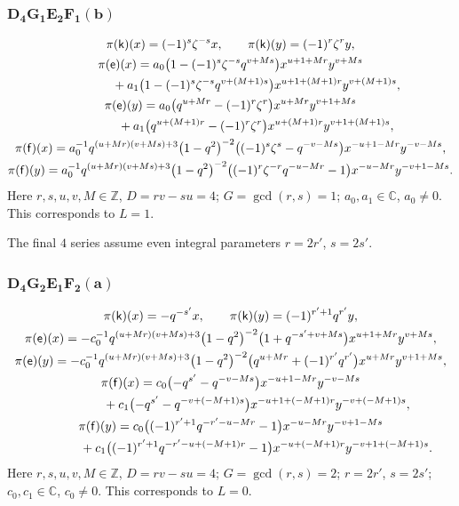 \documentclass[10pt,a4paper]{amsart}
\numberwithin{equation}{section}
\begin{document}
\subsubsection*{$\boldsymbol{D_4G_1E_2F_1(b)}$}
\begin{gather*}
\pi(\mathsf{k})(x)= (-1)^s\zeta^{-s}x ,\qquad\pi(\mathsf{k})(y)=(-1)^r\zeta^ry ,\\
\pi(\mathsf{e})(x)= a_0\big(1-(-1)^s\zeta^{-s}q^{v+Ms}\big)x^{u+1+Mr}y^{v+Ms}\\
\hphantom{\pi(\mathsf{e})(x)=}{} + a_1\big(1-(-1)^s\zeta^{-s}q^{v+(M+1)s}\big)x^{u+1+(M+1)r}y^{v+(M+1)s} ,\\
\pi(\mathsf{e})(y)= a_0\big(q^{u+Mr}-(-1)^r\zeta^r\big)x^{u+Mr}y^{v+1+Ms}\\
\hphantom{\pi(\mathsf{e})(y)=}{} + a_1\big(q^{u+(M+1)r}-(-1)^r\zeta^r\big)x^{u+(M+1)r}y^{v+1+(M+1)s} ,\\
\pi(\mathsf{f})(x)= a_0^{-1}q^{(u+Mr)(v+Ms)+3}\big(1-q^2\big)^{-2}\big((-1)^s\zeta^s-q^{-v-Ms}\big)x^{-u+1-Mr}y^{-v-Ms} ,\\
\pi(\mathsf{f})(y)= a_0^{-1}q^{(u+Mr)(v+Ms)+3}\big(1-q^2\big)^{-2}\big((-1)^r\zeta^{-r}q^{-u-Mr}-1\big)x^{-u-Mr}y^{-v+1-Ms} .
\end{gather*}
Here $r,s,u,v,M\in\mathbb{Z}$, $D=rv-su=4$; $G=\operatorname{gcd}(r,s)=1$; $a_0,a_1\in\mathbb{C}$, $a_0\ne 0$. This corresponds to $L=1$.

The final $4$ series assume even integral parameters $r=2r'$, $s=2s'$.

\subsubsection*{$\boldsymbol{D_4G_2E_1F_2(a)}$}
\begin{gather*}
\pi(\mathsf{k})(x)= -q^{-s'}x ,\qquad\pi(\mathsf{k})(y)=(-1)^{r'+1}q^{r'}y ,\\
\pi(\mathsf{e})(x)= -c_0^{-1}q^{(u+Mr)(v+Ms)+3}\big(1-q^2\big)^{-2}\big(1+q^{-s'+v+Ms}\big)x^{u+1+Mr}y^{v+Ms} ,\\
\pi(\mathsf{e})(y)= -c_0^{-1}q^{(u+Mr)(v+Ms)+3}\big(1-q^2\big)^{-2}\big(q^{u+Mr}+(-1)^{r'}q^{r'}\big)x^{u+Mr}y^{v+1+Ms} ,\\
\pi(\mathsf{f})(x)= c_0\big({-}q^{s'}-q^{-v-Ms}\big)x^{-u+1-Mr}y^{-v-Ms}\\
\hphantom{\pi(\mathsf{f})(x)=}{} + c_1\big({-}q^{s'}-q^{-v+(-M+1)s}\big)x^{-u+1+(-M+1)r}y^{-v+(-M+1)s} ,\\
\pi(\mathsf{f})(y)= c_0\big((-1)^{r'+1}q^{-r'-u-Mr}-1\big)x^{-u-Mr}y^{-v+1-Ms}\\
\hphantom{\pi(\mathsf{f})(y)=}{} + c_1\big((-1)^{r'+1}q^{-r'-u+(-M+1)r}-1\big)x^{-u+(-M+1)r}y^{-v+1+(-M+1)s} .
\end{gather*}
Here $r,s,u,v,M\in\mathbb{Z}$, $D=rv-su=4$; $G=\operatorname{gcd}(r,s)=2$; $r=2r'$, $s=2s'$; $c_0,c_1\in\mathbb{C}$, $c_0\ne 0$. This corresponds to $L=0$.
\end{document}
